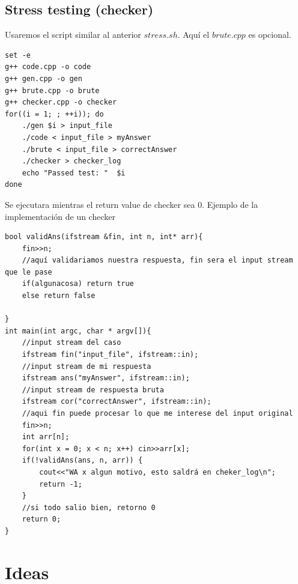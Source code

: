\documentclass[10pt,spanish,mexico]{article}
\numberwithin{equation}{section}
\begin{document}
\begin{multicols}{2}
\vspace{-1.2\baselineskip}
\hrulefill
\subsection{Stress testing (checker)}
Usaremos el script similar al anterior $stress.sh$. Aquí el $brute.cpp$ es opcional.

\begin{verbatim}
set -e
g++ code.cpp -o code
g++ gen.cpp -o gen
g++ brute.cpp -o brute
g++ checker.cpp -o checker
for((i = 1; ; ++i)); do
    ./gen $i > input_file
    ./code < input_file > myAnswer
    ./brute < input_file > correctAnswer
    ./checker > checker_log
    echo "Passed test: "  $i
done
\end{verbatim}

Se ejecutara mientras el return value de checker sea $0$. Ejemplo de la implementación de un checker

\begin{verbatim}
bool validAns(ifstream &fin, int n, int* arr){
    fin>>n;
    //aquí validariamos nuestra respuesta, fin sera el input stream que le pase
    if(algunacosa) return true
    else return false

}
int main(int argc, char * argv[]){
    //input stream del caso
    ifstream fin("input_file", ifstream::in);
    //input stream de mi respuesta
    ifstream ans("myAnswer", ifstream::in);
    //input stream de respuesta bruta
    ifstream cor("correctAnswer", ifstream::in);
    //aqui fin puede procesar lo que me interese del input original
    fin>>n;
    int arr[n];
    for(int x = 0; x < n; x++) cin>>arr[x];
    if(!validAns(ans, n, arr)) {
        cout<<"WA x algun motivo, esto saldrá en cheker_log\n";
        return -1;
    }
    //si todo salio bien, retorno 0
    return 0;
}
\end{verbatim}

\vspace{-1.2\baselineskip}
\hrulefill
\section{Ideas}


\end{multicols}
\end{document}
